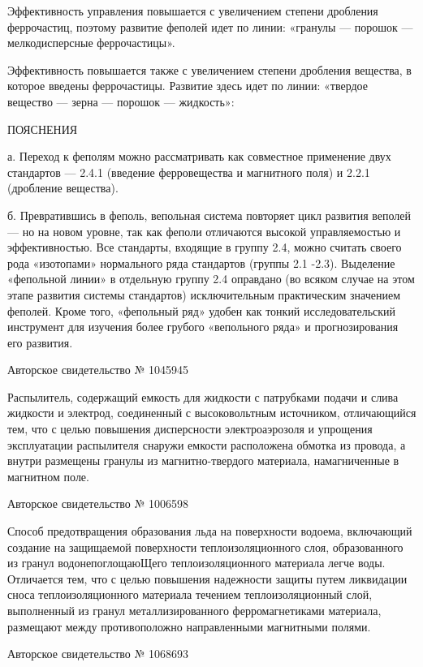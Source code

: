Эффективность  управления повышается  с увеличением  степени дробления
феррочастиц,  поэтому  развитие  феполей  идет по  линии:  «гранулы  —
порошок — мелкодисперсные феррочастицы».

Эффективность  повышается   также  с  увеличением   степени  дробления
вещества,  в  которое введены  феррочастицы.  Развитие  здесь идет  по
линии: «твердое вещество — зерна — порошок — жидкость»:


ПОЯСНЕНИЯ

а.  Переход к  феполям можно  рассматривать как  совместное применение
двух стандартов —  2.4.1 (введение ферровещества и  магнитного поля) и
2.2.1 (дробление вещества).

б. Превратившись  в феполь, вепольная система  повторяет цикл развития
веполей  — но  на  новом  уровне, так  как  феполи отличаются  высокой
управляемостью и эффективностью. Все стандарты, входящие в группу 2.4,
можно  считать своего  рода  «изотопами»  нормального ряда  стандартов
(группы 2.1 -2.3). Выделение «фепольной  линии» в отдельную группу 2.4
оправдано (во всяком случае на этом этапе развития системы стандартов)
исключительным практическим значением  феполей. Кроме того, «фепольный
ряд» удобен как тонкий исследовательский инструмент для изучения более
грубого «вепольного ряда» и прогнозирования его развития.


Авторское свидетельство № 1045945

Распылитель,  содержащий емкость  для жидкости  с патрубками  подачи и
слива жидкости  и электрод,  соединенный с  высоковольтным источником,
отличающийся тем, что с целью повышения дисперсности электроаэрозоля и
упрощения эксплуатации распылителя снаружи емкости расположена обмотка
из провода, а внутри размещены гранулы из магнитно-твердого материала,
намагниченные в магнитном поле.


Авторское свидетельство № 1006598

Способ  предотвращения   образования  льда  на   поверхности  водоема,
включающий  создание  на   защищаемой  поверхности  теплоизоляционного
слоя,  образованного из  гранул водонепоглощаюЩего  теплоизоляционного
материала легче воды. Отличается тем, что с целью повышения надежности
защиты  путем ликвидации  сноса теплоизоляционного  материала течением
теплоизоляционный  слой,  выполненный   из  гранул  металлизированного
ферромагнетиками    материала,    размещают    между    противоположно
направленными магнитными полями.


Авторское свидетельство № 1068693

